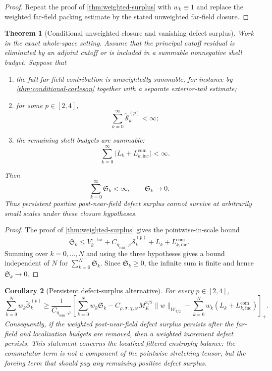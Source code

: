 \documentclass[11pt]{article}
\numberwithin{equation}{section}
\theoremstyle{plain}
\newtheorem{theorem}{Theorem}[section]
\newtheorem{corollary}[theorem]{Corollary}
\theoremstyle{definition}
\theoremstyle{remark}
\begin{document}
\begin{proof}
Repeat the proof of \cref{thm:weighted-surplus} with $w_k\equiv1$ and replace the weighted far-field packing estimate by the stated unweighted far-field closure.
\end{proof}


\begin{theorem}[Conditional unweighted closure and vanishing defect surplus]\label{thm:balance-closure-vanishing}
Work in the exact whole-space setting.  Assume that the principal cutoff residual is eliminated by an adjoint cutoff or is included in a summable nonnegative shell budget.  Suppose that
\begin{enumerate}[label=\textup{(\roman*)},leftmargin=2.2em]
\item the full far-field contribution is unweightedly summable, for instance by \cref{thm:conditional-carleson} together with a separate exterior-tail estimate;
\item for some $p\in[2,4]$,
\[
\sum_{k=0}^{\infty}\widetilde{\mathcal S}_k^{(p)}<\infty;
\]
\item the remaining shell budgets are summable:
\[
\sum_{k=0}^{\infty}\bigl(L_k+L_{k,\mathrm{inc}}^{\mathrm{com}}\bigr)<\infty.
\]
\end{enumerate}
Then
\[
\sum_{k=0}^{\infty}\mathfrak S_k<\infty,
\qquad
\mathfrak S_k\to0.
\]
Thus persistent positive post-near-field defect surplus cannot survive at arbitrarily small scales under these closure hypotheses.
\end{theorem}

\begin{proof}
The proof of \cref{thm:weighted-surplus} gives the pointwise-in-scale bound
\[
\mathfrak S_k
\le
V_k^{+,\mathrm{far}}
+C_{\eta_{\mathrm{com}},\varphi}\widetilde{\mathcal S}_k^{(p)}
+L_k+L_{k,\mathrm{inc}}^{\mathrm{com}}.
\]
Summing over $k=0,\dots,N$ and using the three hypotheses gives a bound independent of $N$ for $\sum_{k=0}^{N}\mathfrak S_k$.  Since $\mathfrak S_k\ge0$, the infinite sum is finite and hence $\mathfrak S_k\to0$.
\end{proof}

\begin{corollary}[Persistent defect-surplus alternative]\label{cor:filtered-increment-defect-alt}
For every $p\in[2,4]$,
\begin{equation}\label{eq:filtered-increment-defect-lower}
\sum_{k=0}^{N}w_k\widetilde{\mathcal S}_k^{(p)}
\ge
\frac1{C_{\eta_{\mathrm{com}},\varphi}}
\left[
\sum_{k=0}^{N}w_k\mathfrak S_k
-
C_{\rho,\sigma,\chi,\varphi}M_E^{3/2}\|w\|_{\mathcal W_{3/2}}
-
\sum_{k=0}^{N}w_k(L_k+L_{k,\mathrm{inc}}^{\mathrm{com}})
\right]_+.
\end{equation}
Consequently, if the weighted post-near-field defect surplus persists after the far-field and localization budgets are removed, then a weighted increment defect persists.  This statement concerns the localized filtered enstrophy balance: the commutator term is not a component of the pointwise stretching tensor, but the forcing term that should pay any remaining positive defect surplus.
\end{corollary}
\end{document}
